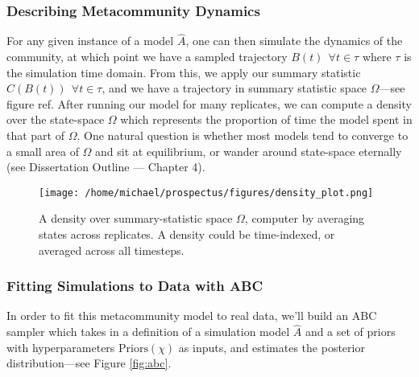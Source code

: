 \documentclass[]{article}
\begin{document}
\hypertarget{finding-the-pseudoequilibria-of-our-metacommunity-model}{%
\subsubsection{Describing Metacommunity Dynamics}
\label{finding-the-pseudoequilibria-of-our-metacommunity-model}}

For any given instance of a model $\hat{A}$, one can then simulate the dynamics of the community, at which point we have a sampled trajectory $B(t) \ \ \forall t \in \tau$ where $\tau$ is the simulation time domain. From this, we apply our summary statistic $C(B(t)) \ \ \forall t \in \tau$, and we have a trajectory in summary statistic space $\Omega$---see figure ref. After running our model for many replicates, we can compute a density over the state-space $\Omega$ which represents the proportion of time the model spent in that part of $\Omega$.
One natural question is whether most models tend to converge to a small area of $\Omega$ and sit at equilibrium, or wander around state-space eternally (see Dissertation Outline --- Chapter 4).



\begin{figure}[H]
\centering
\texttt{[image: /home/michael/prospectus/figures/density\_plot.png]}
\caption{A density over summary-statistic space $\Omega$, computer by averaging states across replicates. A density could be time-indexed, or averaged across all timesteps.}
\end{figure}

\hypertarget{fitting-to-data-with-abc}{%
\subsubsection{Fitting Simulations to Data with
ABC}\label{fitting-to-data-with-abc}}

In order to fit this metacommunity model to real data, we'll build an ABC sampler which takes in a definition of a simulation model $\hat{A}$
and a set of priors with hyperparameters
$\text{Priors}(\chi)$ as inputs, and estimates the posterior distribution---see Figure \ref{fig:abc}.
\end{document}
